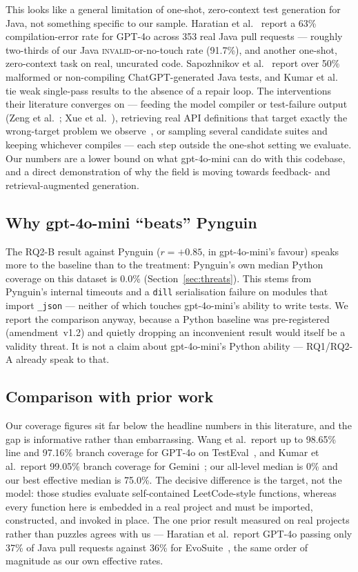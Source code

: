 This looks like a general limitation of one-shot, zero-context test generation for Java,
not something specific to our sample. Haratian et al.~\cite{haratian2026praware} report a
63\% compilation-error rate for GPT-4o across 353 real Java pull requests --- roughly
two-thirds of our Java \textsc{invalid}-or-no-touch rate (91.7\%), and another one-shot,
zero-context task on real, uncurated code. Sapozhnikov
et al.~\cite{sapozhnikov2024empirical} report over 50\% malformed or non-compiling
ChatGPT-generated Java tests, and Kumar et al.~\cite{kumar2025empirical} tie weak
single-pass results to the absence of a repair loop. The interventions their literature
converges on --- feeding the model compiler or test-failure output
(Zeng et al.~\cite{zeng2026logic}; Xue et al.~\cite{xue2025distinct}), retrieving real API
definitions that target exactly the wrong-target problem we
observe~\cite{liu2025typeaware}, or sampling several candidate suites and keeping whichever
compiles --- each step outside the one-shot setting we evaluate. Our numbers are a lower
bound on what gpt-4o-mini can do with this codebase, and a direct demonstration of why the
field is moving towards feedback- and retrieval-augmented generation.

\subsection{Why gpt-4o-mini ``beats'' Pynguin}
The RQ2-B result against Pynguin ($r=+0.85$, in gpt-4o-mini's favour) speaks more to the
baseline than to the treatment: Pynguin's own median Python coverage on this dataset is
0.0\% (Section~\ref{sec:threats}). This stems from Pynguin's internal timeouts and a
\texttt{dill} serialisation failure on modules that import \texttt{\_json} --- neither of
which touches gpt-4o-mini's ability to write tests. We report the comparison anyway,
because a Python baseline was pre-registered (amendment~v1.2) and quietly dropping an
inconvenient result would itself be a validity threat. It is not a claim about
gpt-4o-mini's Python ability --- RQ1/RQ2-A already speak to that.

\subsection{Comparison with prior work}
Our coverage figures sit far below the headline numbers in this literature, and the gap is
informative rather than embarrassing. Wang et al.\ report up to 98.65\% line and 97.16\%
branch coverage for GPT-4o on TestEval~\cite{wang2025testeval}, and Kumar et al.\ report
99.05\% branch coverage for Gemini~\cite{kumar2025empirical}; our all-level median is 0\% and
our best effective median is 75.0\%. The decisive difference is the target, not the model:
those studies evaluate self-contained LeetCode-style functions, whereas every function here
is embedded in a real project and must be imported, constructed, and invoked in place. The
one prior result measured on real projects rather than puzzles agrees with us --- Haratian et
al.\ report GPT-4o passing only 37\% of Java pull requests against 36\% for
EvoSuite~\cite{haratian2026praware}, the same order of magnitude as our own effective rates.

